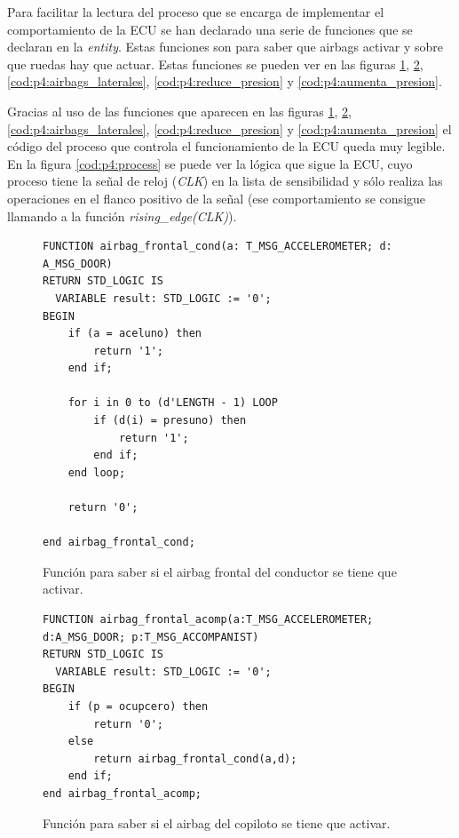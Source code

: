 \documentclass{article}
\begin{document}
Para facilitar la lectura del proceso que se encarga de implementar el comportamiento de la ECU se han declarado una serie de funciones que se declaran en la \emph{entity}. Estas funciones son para saber que airbags activar y sobre que ruedas hay que actuar. Estas funciones se pueden ver en las figuras \ref{cod:p4:airbag_frontal_cond}, \ref{cod:p4:airbag_frontal_acomp}, \ref{cod:p4:airbags_laterales}, \ref{cod:p4:reduce_presion} y \ref{cod:p4:aumenta_presion}.

Gracias al uso de las funciones que aparecen en las figuras
\ref{cod:p4:airbag_frontal_cond}, \ref{cod:p4:airbag_frontal_acomp}, \ref{cod:p4:airbags_laterales}, \ref{cod:p4:reduce_presion} y \ref{cod:p4:aumenta_presion}
el código del proceso que controla el funcionamiento de la ECU queda muy legible. En la figura \ref{cod:p4:process} se puede ver la lógica que sigue la ECU, cuyo proceso tiene la señal de reloj (\emph{CLK}) en la lista de sensibilidad y sólo realiza las operaciones en el flanco positivo de la señal (ese comportamiento se consigue llamando a la función \emph{rising\_edge(CLK)}).

\begin{figure}[h]
	\begin{lstlisting}[style=vhdl]
FUNCTION airbag_frontal_cond(a: T_MSG_ACCELEROMETER; d: A_MSG_DOOR)
RETURN STD_LOGIC IS
  VARIABLE result: STD_LOGIC := '0';
BEGIN
	if (a = aceluno) then
		return '1';
	end if;
	
	for i in 0 to (d'LENGTH - 1) LOOP
		if (d(i) = presuno) then
			return '1';
		end if;
	end loop;
	
	return '0';

end airbag_frontal_cond;
	\end{lstlisting}
	\caption{Función para saber si el airbag frontal del conductor se tiene que activar.}
	\label{cod:p4:airbag_frontal_cond}
\end{figure}

\begin{figure}[h]
	\begin{lstlisting}[style=vhdl]
FUNCTION airbag_frontal_acomp(a:T_MSG_ACCELEROMETER; d:A_MSG_DOOR; p:T_MSG_ACCOMPANIST)
RETURN STD_LOGIC IS
  VARIABLE result: STD_LOGIC := '0';
BEGIN
	if (p = ocupcero) then
		return '0';
	else
		return airbag_frontal_cond(a,d);
	end if;
end airbag_frontal_acomp;
	\end{lstlisting}
	\caption{Función para saber si el airbag del copiloto se tiene que activar.}
	\label{cod:p4:airbag_frontal_acomp}
\end{figure}	
\end{document}

